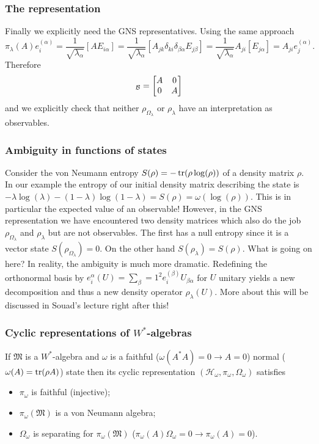 \documentclass{beamer}
\begin{document}
\begin{frame}
	\frametitle{The representation}
	Finally we explicitly need the GNS representatives. Using the same approach
	\begin{equation*}
		\pi_\lambda(A)e_i^{(\alpha)}=\frac{1}{\sqrt{\lambda_\alpha}}[AE_{i\alpha}]=\frac{1}{\sqrt{\lambda_\alpha}}[A_{jk}\delta_{ki}\delta_{\beta\alpha}E_{j\beta}]=\frac{1}{\sqrt{\lambda_\alpha}}A_{ji}[E_{j\alpha}]=A_{ji}e_j^{(\alpha)}.
	\end{equation*}
	Therefore
	\begin{equation}
		[\pi_\lambda(A)]_\mathcal{B}=\mqty[A & 0\\0 &  A]
	\end{equation}
	and we explicitly check that neither $\rho_{\Omega_\lambda}$ or $\rho_\lambda$ have an interpretation as observables.
\end{frame}

\begin{frame}
	\frametitle{Ambiguity in functions of states}
	Consider the von Neumann entropy $S(\rho)=-\tr(\rho\log(\rho))$ of a density matrix $\rho$. In our example the entropy of our initial density matrix describing the state is $-\lambda\log(\lambda)-(1-\lambda)\log(1-\lambda)=S(\rho)=\omega(\log(\rho))$. This is in particular the expected value of an observable! However, in the GNS representation we have encountered two density matrices which also do the job $\rho_{\Omega_\lambda}$ and $\rho_\lambda$ but are not observables. The first has a null entropy since it is a vector state $S(\rho_{\Omega_\lambda})=0$. On the other hand $S(\rho_\lambda)=S(\rho)$. What is going on here? In reality, the ambiguity is much more dramatic. Redefining the orthonormal basis by $e_i^{\alpha}(U)=\sum_\beta=1^2e_i^{(\beta)}U_{\beta\alpha}$ for $U$ unitary yields a new decomposition and thus a new density operator $\rho_\lambda(U)$. More about this will be discussed in Souad's lecture right after this!
\end{frame}

\begin{frame}
\frametitle{Cyclic representations of $W^*$-algebras}
\begin{theorem}[$\bigstar$]
If $\mathfrak{M}$ is a $W^*$-algebra and $\omega$ is a faithful ($\omega(A^*A)=0\rightarrow A=0$) normal ($\omega(A)=\tr(\rho A)$) state then its cyclic representation $(\mathcal{H}_\omega,\pi_\omega,\Omega_\omega)$ satisfies
\begin{itemize}
	\item $\pi_\omega$ is faithful (injective);
	\item $\pi_\omega(\mathfrak{M})$ is a von Neumann algebra;
	\item $\Omega_\omega$ is separating for $\pi_\omega(\mathfrak{M})$ ($\pi_\omega(A)\Omega_\omega=0\rightarrow\pi_\omega(A)=0$).
\end{itemize}
\end{theorem}
\end{frame}
\end{document}
